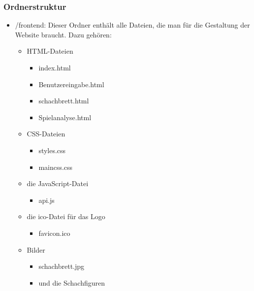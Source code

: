 \subsubsection{Ordnerstruktur}
\begin{itemize}
    \item /frontend: Dieser Ordner enthält alle Dateien, die man für die Gestaltung der 
    Website braucht. Dazu gehören:
        \begin{itemize}
            \item HTML-Dateien 
                \begin{itemize} 
                    \item index.html 
                    \item Benutzereingabe.html
                    \item schachbrett.html
                    \item Spielanalyse.html 
                \end{itemize}
            \item CSS-Dateien
                \begin{itemize}
                    \item styles.css
                    \item maincss.css
                \end{itemize}
            \item die JavaScript-Datei
                \begin{itemize}
                    \item api.js
                \end{itemize}
            \item die ico-Datei für das Logo
                \begin{itemize}
                    \item favicon.ico
                \end{itemize}
            \item Bilder
                \begin{itemize}
                    \item schachbrett.jpg
                    \item und die Schachfiguren
                \end{itemize}
        \end{itemize} 
        

\end{itemize}
